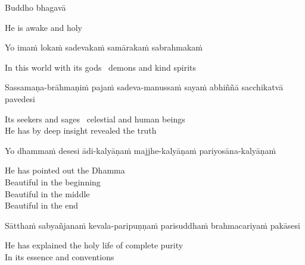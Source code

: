 Buddho bhagavā

\begin{english}
  He is awake and holy
\end{english}

Yo imaṁ lokaṁ sadevakaṁ samārakaṁ sabrahmakaṁ

\begin{english}
  In this world with its gods \breathmark\ demons and kind spirits
\end{english}

\begin{pali-hang}
  Sassamaṇa-brāhmaṇiṁ pajaṁ sadeva-manussaṁ sayaṁ abhiññā sacchikatvā pavedesi
\end{pali-hang}

\begin{english}
  Its seekers and sages \breathmark\ celestial and human beings\\
  He has by deep insight revealed the truth
\end{english}

\begin{pali-hang}
  Yo dhammaṁ desesi ādi-kalyāṇaṁ majjhe-kalyāṇaṁ pariyosāna-kalyāṇaṁ
\end{pali-hang}

\begin{english-verses}
  He has pointed out the Dhamma\\
  Beautiful in the beginning\\
  Beautiful in the middle\\
  Beautiful in the end\\
\end{english-verses}

\begin{pali-hang}
  Sātthaṁ sabyañjanaṁ kevala-paripuṇṇaṁ parisuddhaṁ brahmacariyaṁ pakāsesi
\end{pali-hang}

\begin{english}
  He has explained the holy life of complete purity\ifdigital\makeatletter\hyperlink{endnote4-appendix}\makeatother\fi\\
  In its essence and conventions
\end{english}

